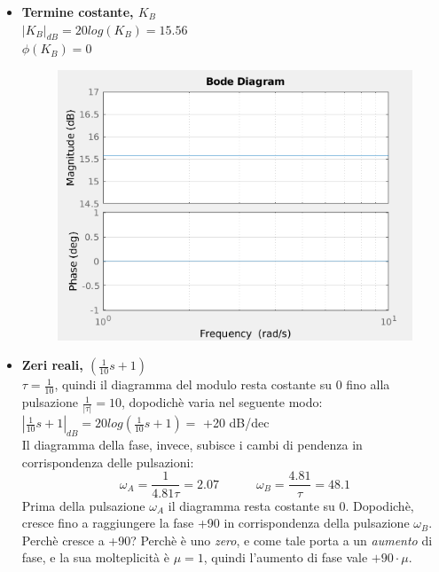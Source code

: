 \documentclass[12pt,a4paper]{article}
\begin{document}
	\begin{itemize}
		\item \textbf{Termine costante, $K_B$}\vspace{5px}\\
		$|K_B|_{dB} = 20log(K_B) = 15.56$\\
		$\phi(K_B) = 0$\degree
		\begin{figure}[h!]
			\centering
			\includegraphics[scale=0.5]{./images/bode44_1.png}
		\end{figure}
	\newpage
		\item \textbf{Zeri reali, $(\frac{1}{10}s + 1)$}\vspace{5px}\\
		$\tau = \frac{1}{10}$, quindi il diagramma del modulo resta costante su 0 fino alla pulsazione $\frac{1}{|\tau|} = 10$, dopodich\`e varia nel seguente modo:\vspace{5px}\\
		$|\frac{1}{10}s + 1|_{dB} = 20log(\frac{1}{10}s + 1) =$ +20 dB/dec\vspace{5px}\\
		Il diagramma della fase, invece, subisce i cambi di pendenza in corrispondenza delle pulsazioni:
		\[
			\omega_A = \frac{1}{4.81\tau} = 2.07\quad\quad\quad\omega_B = \frac{4.81}{\tau} = 48.1
		\]
		Prima della pulsazione $\omega_A$ il diagramma resta costante su 0. Dopodich\`e, cresce fino a raggiungere la fase +90 in corrispondenza della pulsazione $\omega_B$.\\Perch\`e cresce a +90? Perch\`e \`e uno \textit{zero}, e come tale porta a un \textit{aumento} di fase, e la sua molteplicit\`a \`e $\mu = 1$, quindi l'aumento di fase vale $+90 \cdot \mu$.

\end{itemize}
\end{document}
